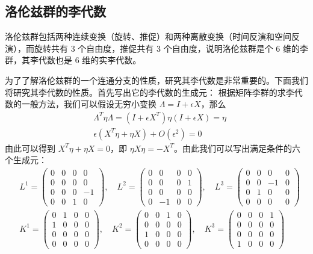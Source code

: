 \subsection{洛伦兹群的李代数}
洛伦兹群包括两种连续变换（旋转、推促）和两种离散变换（时间反演和空间反演），而旋转共有 $3$ 个自由度，推促共有 $3$ 个自由度，说明洛伦兹群是个 $6$ 维的李群，其李代数也是 $6$ 维的实李代数。

为了了解洛伦兹群的一个连通分支的性质，研究其李代数是非常重要的。下面我们将研究其李代数的性质。首先写出它的李代数的生成元：
根据矩阵李群的求李代数的一般方法，我们可以假设无穷小变换 $\Lambda=I+\epsilon X$，那么
\begin{equation}
\begin{aligned}
&\Lambda^T \eta \Lambda = (I+\epsilon X^T)\eta (I+\epsilon X)=\eta\\
&\epsilon (X^T \eta + \eta X)+O(\epsilon^2)=0
\end{aligned}
\end{equation}
由此可以得到 $X^T\eta+\eta X=0$，即 $\eta X \eta = -X^T$。由此我们可以写出满足条件的六个生成元：
\begin{equation}
\begin{aligned}
&L^1=
\begin{pmatrix}
0 & 0 & 0 & 0\\
0 & 0 & 0 & 0\\
0 & 0 & 0 & -1\\
0 & 0 & 1 & 0
\end{pmatrix}
,\quad
L^2=
\begin{pmatrix}
0 & 0 & 0 & 0\\
0 & 0 & 0 & 1\\
0 & 0 & 0 & 0\\
0 & -1 & 0 & 0
\end{pmatrix}
,\quad
L^3=
\begin{pmatrix}
0 & 0 & 0 & 0\\
0 & 0 & -1 & 0\\
0 & 1 & 0 & 0\\
0 & 0 & 0 & 0
\end{pmatrix}\\
& K^1=\begin{pmatrix}
0 & 1 & 0 & 0\\
1 & 0 & 0 & 0\\
0 & 0 & 0 & 0\\
0 & 0 & 0 & 0
\end{pmatrix}
,\quad 
K^2=\begin{pmatrix}
0 & 0 & 1 & 0\\
0 & 0 & 0 & 0\\
1 & 0 & 0 & 0\\
0 & 0 & 0 & 0
\end{pmatrix}
,\quad  K^3=\begin{pmatrix}
0 & 0 & 0 & 1\\
0 & 0 & 0 & 0\\
0 & 0 & 0 & 0\\
1 & 0 & 0 & 0
\end{pmatrix}
\end{aligned}
\end{equation}
